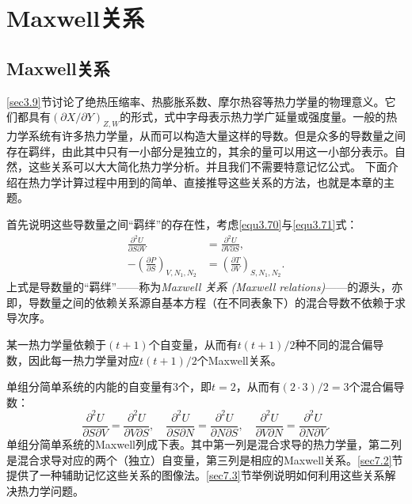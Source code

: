 
\chapter{Maxwell关系}
\label{chap7}

\section{Maxwell关系}
\label{sec7.1}
\ref{sec3.9}节讨论了绝热压缩率、热膨胀系数、摩尔热容等热力学量的物理意义。它们都具有$(\partial X / \partial Y)_{Z, W}$的形式，式中字母表示热力学广延量或强度量。一般的热力学系统有许多热力学量，从而可以构造大量这样的导数。但是众多的导数量之间存在羁绊，由此其中只有一小部分是独立的，其余的量可以用这一小部分表示。自然，这些关系可以大大简化热力学分析。并且我们不需要特意记忆公式。 下面介绍在热力学计算过程中用到的简单、直接推导这些关系的方法，也就是本章的主题。

首先说明这些导数量之间“羁绊”的存在性，考虑\eqref{equ3.70}与\eqref{equ3.71}式：
\begin{align}
	\frac{\partial^2 U}{\partial S \partial V} &= \frac{\partial^2 U}{\partial V \partial S}, \label{equ7.1} \\
	-\left( \frac{\partial P}{\partial S} \right)_{V, N_1, N_2} &= \left( \frac{\partial T}{\partial V} \right)_{S, N_1, N_2}. \label{equ7.2}
\end{align}
上式是导数量的“羁绊”——称为{\it Maxwell 关系 (Maxwell relations)}——的源头，亦即，导数量之间的依赖关系源自基本方程（在不同表象下）的混合导数不依赖于求导次序。

某一热力学量依赖于$(t + 1)$个自变量，从而有$t(t + 1)/2$种不同的混合偏导数，因此每一热力学量对应$t(t + 1)/2$个Maxwell关系。

单组分简单系统的内能的自变量有$3$个，即$t = 2$，从而有$(2 \cdot 3)/2 = 3$个混合偏导数：
\[
	\frac{\partial^2 U}{\partial S \partial V} = \frac{\partial^2 U}{\partial V \partial S}, \quad \frac{\partial^2 U}{\partial S \partial N} = \frac{\partial^2 U}{\partial N \partial S}, \quad \frac{\partial^2 U}{\partial V \partial N} = \frac{\partial^2 U}{\partial N \partial V}.
\]
单组分简单系统的Maxwell列成下表。其中第一列是混合求导的热力学量，第二列是混合求导对应的两个（独立）自变量，第三列是相应的Maxwell关系。\ref{sec7.2}节提供了一种辅助记忆这些关系的图像法。\ref{sec7.3}节举例说明如何利用这些关系解决热力学问题。

